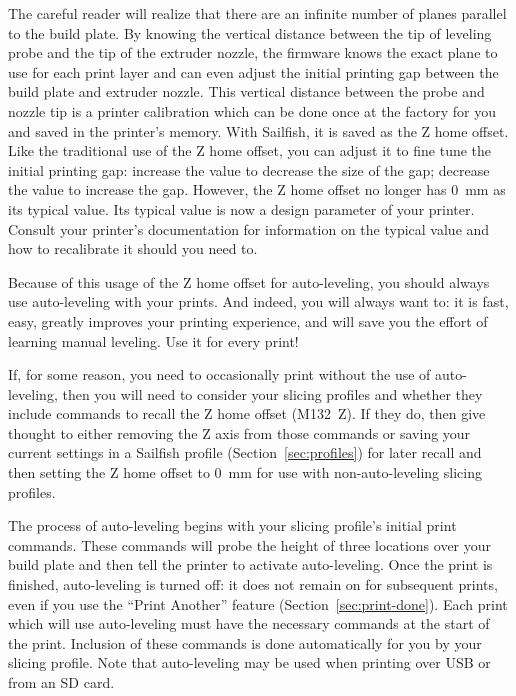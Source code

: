 The careful reader will realize that there are an infinite number of
planes parallel to the build plate.  By knowing the vertical distance between
the tip of leveling probe and the tip of the extruder nozzle, the firmware
knows the exact plane to use for each print layer and can even adjust
the initial printing gap between the build plate and extruder nozzle.
This vertical distance between the probe and nozzle tip is a printer calibration
which can be done once at the factory for you and saved in the printer's
memory.  With Sailfish, it is saved as the Z home offset.  Like the traditional
use of the Z home offset, you can adjust it to fine tune the initial
printing gap: increase the value to
decrease the size of the gap; decrease the value to increase the gap.  However,
the Z home offset no longer has 0~mm as its typical value.  Its typical value
is now a design parameter of your printer.  Consult your printer's
documentation for information on the typical value and how to recalibrate it
should you need to.

Because of this usage of the Z home offset for auto-leveling, you should
always use auto-leveling with your prints.   And indeed, you will always
want to: it is fast, easy, greatly improves your printing experience,
and will save you the effort of learning manual leveling.
Use it for every print!

If, for some reason, you need to occasionally print without the use of
auto-leveling, then you will need to consider your slicing profiles and
whether they include commands to recall the Z home offset (M132~Z).  If they
do, then give thought to either removing the Z axis from those commands or
saving your current settings in a Sailfish profile (Section~\ref{sec:profiles})
for later recall and then setting the Z home offset to 0~mm for use with
non-auto-leveling slicing profiles.

The process of auto-leveling begins with your slicing profile's
initial print commands.  These commands will probe the height of three
locations over your build plate and then tell the printer to activate
auto-leveling.  Once the print is finished, auto-leveling is turned
off: it does not remain on for subsequent prints, even if you use the
``Print Another'' feature (Section~\ref{sec:print-done}).  Each print
which will use auto-leveling must have the necessary commands at the
start of the print.  Inclusion of these commands is done automatically
for you by your slicing profile.  Note that auto-leveling may be used
when printing over USB or from an SD card.

